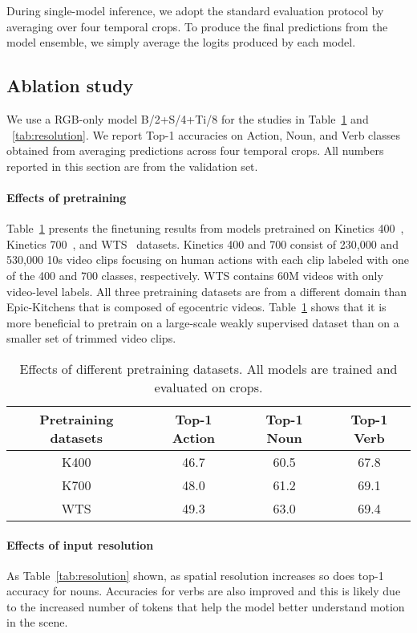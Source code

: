 During single-model inference, we adopt the standard evaluation protocol by averaging over four temporal crops. To produce the final predictions from the model ensemble, we simply average the logits produced by each model.

\subsection{Ablation study} 
\label{sec:ablations}
We use a RGB-only model B/2+S/4+Ti/8 for the studies in Table~\ref{tab:pretraining} and ~\ref{tab:resolution}. We report Top-1 accuracies on Action, Noun, and Verb classes obtained from averaging predictions across four temporal crops. All numbers reported in this section are from the validation set.

\paragraph{Effects of pretraining}
Table~\ref{tab:pretraining} presents the finetuning results from models pretrained on Kinetics 400~\cite{kay_arxiv_2017}, Kinetics 700~\cite{kay_arxiv_2017}, and WTS~\cite{stroud2020learning} datasets. Kinetics 400 and 700 consist of 230,000 and 530,000 10s video clips focusing on human actions with each clip labeled with one of the 400 and 700 classes, respectively. WTS contains 60M videos with only video-level labels. All three pretraining datasets are from a different domain than Epic-Kitchens that is composed of egocentric videos. Table~\ref{tab:pretraining} shows that it is more beneficial to pretrain on a large-scale weakly supervised dataset than on a smaller set of trimmed video clips.
\begin{table} 
	\centering
	\scriptsize{
\begin{tabular}{  c  c  c  c }
    \toprule
    Pretraining datasets & Top-1 Action & Top-1 Noun & Top-1 Verb \\
    \midrule
    K400 & 46.7 & 60.5 & 67.8 \\
    K700 & 48.0 & 61.2 & 69.1 \\
    WTS & 49.3 & 63.0 & 69.4 \\
    \bottomrule
   \end{tabular}
   }
	\caption{Effects of different pretraining datasets. All models are trained and evaluated on  crops.}
\label{tab:pretraining}
\end{table}
 
\paragraph{Effects of input resolution}
As Table~\ref{tab:resolution} shown, as spatial resolution increases so does top-1 accuracy for nouns. Accuracies for verbs are also improved and this is likely due to the increased number of tokens that help the model better understand motion in the scene.

